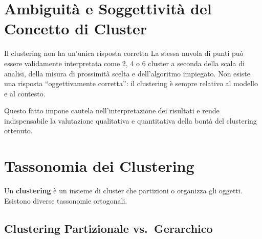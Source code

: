 \section{Ambiguità e Soggettività del Concetto di Cluster}
\label{sec:cluster-ambiguity}

\begin{alertblock}{Il clustering non ha un'unica risposta corretta}
La stessa nuvola di punti può essere validamente interpretata come 2, 4 o 6 cluster a seconda della scala di analisi, della misura di prossimità scelta e dell'algoritmo impiegato. Non esiste una risposta ``oggettivamente corretta'': il clustering è sempre relativo al modello e al contesto.
\end{alertblock}

Questo fatto impone cautela nell'interpretazione dei risultati e rende indispensabile la valutazione qualitativa e quantitativa della bontà del clustering ottenuto.

\section{Tassonomia dei Clustering}
\label{sec:clustering-types}

Un \textbf{clustering} è un insieme di cluster che partizioni o organizza gli oggetti. Esistono diverse tassonomie ortogonali.

\subsection{Clustering Partizionale vs.\ Gerarchico}

